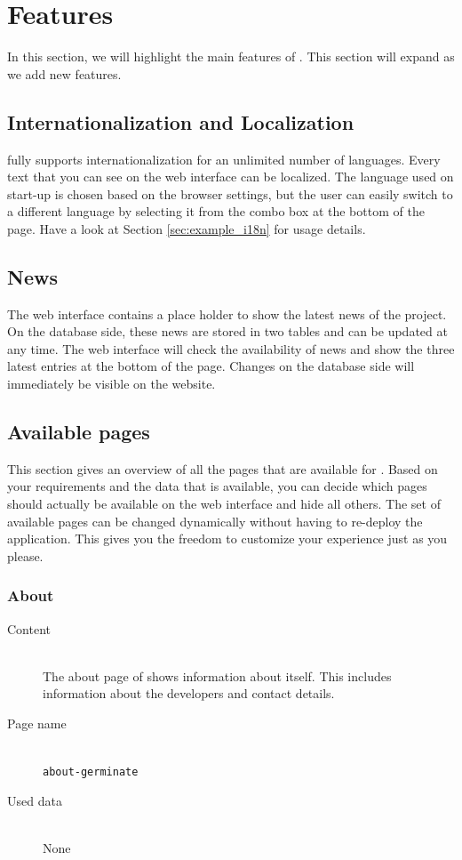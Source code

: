 \section{Features}
In this section, we will highlight the main features of {\germinate}. This section will expand as we add new features.

\subsection{Internationalization and Localization}
\label{sec:features_i18n}
{\germinate} fully supports internationalization for an unlimited number of languages. Every text that you can see on the web interface can be localized. The language used on start-up is chosen based on the browser settings, but the user can easily switch to a different language by selecting it from the combo box at the bottom of the page. Have a look at Section \ref{sec:example_i18n} for usage details.

\subsection{News}
The {\germinate} web interface contains a place holder to show the latest news of the project. On the database side, these news are stored in two tables and can be updated at any time. The web interface will check the availability of news and show the three latest entries at the bottom of the page. Changes on the database side will immediately be visible on the website.

\subsection{Available pages}
\label{sec:pages}
This section gives an overview of all the pages that are available for {\germinate}. Based on your requirements and the data that is available, you can decide which pages should actually be available on the web interface and hide all others. The set of available pages can be changed dynamically without having to re-deploy the application. This gives you the freedom to customize your {\germinate} experience just as you please.

\subsubsection{About {\germinate}}
\begin{description}
	\item[Content]\hfill\\The about page of {\germinate} shows information about {\germinate} itself. This includes information about the developers and contact details.
	\item[Page name]\hfill\\\texttt{about-germinate}
	\item[Used data]\hfill\\None
\end{description}

